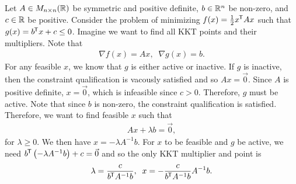 \begin{exmp}
    Let $A \in M_{n\times n}(\mathbb{R})$ be symmetric and positive definite, $b \in \mathbb{R}^n$ be non-zero, and $c \in \mathbb{R}$ be positive. Consider the problem of minimizing $f(x) = \frac{1}{2}{x}^{\mkern-1.5mu\mathsf{T}}Ax$ such that $g(x) = {b}^{\mkern-1.5mu\mathsf{T}}x + c \leq 0$. Imagine we want to find all KKT points and their multipliers. Note that
    \begin{align*}
        \nabla f(x) = Ax,\;\;
        \nabla g(x) = b.
    \end{align*}
    For any feasible $x$, we know that $g$ is either active or inactive. If $g$ is inactive, then the constraint qualification is vacously satisfied and so $Ax = \vec{0}$. Since $A$ is positive definite, $x = \vec{0}$, which is infeasible since $c > 0$. Therefore, $g$ must be active. Note that since $b$ is non-zero, the constraint qualification is satisfied. Therefore, we want to find feasible $x$ such that
    \begin{align*}
        Ax + \lambda b = \vec{0},
    \end{align*}
    for $\lambda \geq 0$. We then have $x = -\lambda A^{-1}b$. For $x$ to be feasible and $g$ be active, we need ${b}^{\mkern-1.5mu\mathsf{T}}\left(-\lambda A^{-1}b\right) + c = \vec{0}$ and so the only KKT multiplier and point is
    \begin{align*}
        \lambda = \frac{c}{{b}^{\mkern-1.5mu\mathsf{T}}A^{-1}b},\;\; x = -\frac{c}{{b}^{\mkern-1.5mu\mathsf{T}}A^{-1}b}A^{-1}b.
    \end{align*}
\end{exmp}

